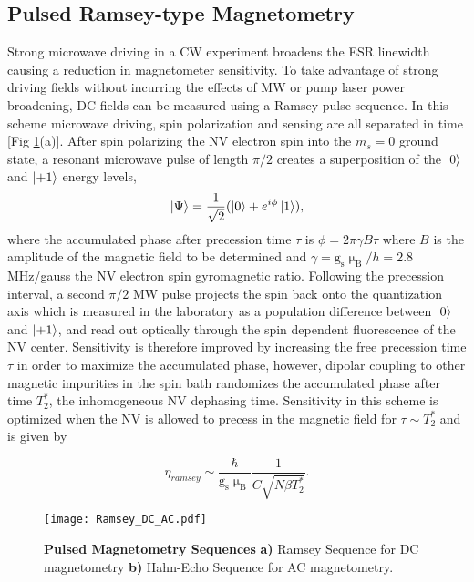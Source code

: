 
\subsection{Pulsed Ramsey-type Magnetometry} \label{Pulsed_Ramsey}

Strong microwave driving in a CW experiment broadens the ESR linewidth causing a reduction in magnetometer sensitivity. To take advantage of strong driving fields without incurring the effects of MW or pump laser power broadening, DC fields can be measured using a Ramsey pulse sequence. In this scheme microwave driving, spin polarization and sensing are all separated in time [Fig \ref{Fig_two}(a)]. After spin polarizing the NV electron spin into the $m_s = 0$ ground state, a resonant microwave pulse of length $\pi/2$ creates a superposition of the $\ket{0}$ and $\ket{+1}$ energy levels,
$$\ket{\Psi} = \frac{1}{\sqrt{2}}(\ket{0} + e^{i\phi}\ket{1}),$$
where the accumulated phase after precession time $\tau$ is $\phi = 2\pi \gamma B \tau$ where $B$ is the amplitude of the magnetic field to be determined and $\gamma = \text{g}_\text{s} \upmu_\text{B} / h = 2.8$ MHz/gauss the NV electron spin gyromagnetic ratio. Following the precession interval, a second $\pi/2$ MW pulse projects the spin back onto the quantization axis which is measured in the laboratory as a population difference between $\ket{0}$ and $\ket{+1}$, and read out optically through the spin dependent fluorescence of the NV center. Sensitivity is therefore improved by increasing the free precession time $\tau$ in order to maximize the accumulated phase, however, dipolar coupling to other magnetic impurities in the spin bath randomizes the accumulated phase after time $T_2^*$, the inhomogeneous NV dephasing time. Sensitivity in this scheme is optimized when the NV is allowed to precess in the magnetic field for $\tau \sim T_2^*$ and is given by 

$$\eta_{ramsey} \sim \frac{\hbar}{\text{g}_\text{s} \upmu_{\text{B}}} \frac{1}{C\sqrt{N \beta T_2^*}}.$$ 

\begin{figure}[t!]
\centering
\texttt{[image: Ramsey\_DC\_AC.pdf]}  
\caption{\textbf{Pulsed Magnetometry Sequences} \textbf{a)} Ramsey Sequence for DC magnetometry \textbf{b)} Hahn-Echo Sequence for AC magnetometry.}
\label{Fig_two}
\end{figure}


